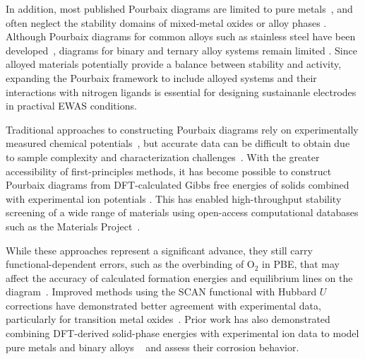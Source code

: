 \documentclass[journal=jacsat,manuscript=article]{achemso}
\begin{document}
In addition, most published Pourbaix diagrams are limited to pure metals~\cite{PourbaixAtlasSolutions, Cao2020E-pHLaterite, HongOn, Meng1996PrinciplesReview}, and often neglect the stability domains of mixed-metal oxides or alloy phases \cite{Ding2018ElectrochemicalStates}. Although Pourbaix diagrams for common alloys such as stainless steel have been developed~\cite{Cubicciotti1985TheSteel, Beverskog1999PourbaixIron-Chromium-Nickel}, diagrams for binary and ternary alloy systems remain limited \cite{Dong2021ElectrochemicalData, Ding2018ElectrochemicalStates}. Since alloyed materials potentially provide a balance between stability and activity, expanding the Pourbaix framework to include alloyed systems and their interactions with nitrogen ligands is essential for designing sustainanle electrodes in practival EWAS conditions.


Traditional approaches to constructing Pourbaix diagrams rely on experimentally measured chemical potentials~\cite{PourbaixAtlasSolutions, Pourbaix1973LecturesCorrosion, Beverskog1999PourbaixIron-Chromium-Nickel}, but accurate data can be difficult to obtain due to sample complexity and characterization challenges~\cite{Huang2017ImprovedCompounds}. With the greater accessibility of first-principles methods, it has become possible to construct Pourbaix diagrams from DFT-calculated Gibbs free energies of solids combined with experimental ion potentials \cite{Wang2020PredictingFunctional, Lopez2023ComputationalStudies, Liu2024ReversiblePH, Ding2018ElectrochemicalStates, Huang2015ElectrochemicalCalculations, Persson2012PredictionStates, Patel2019EfficientCompounds, Oses2018AFLOW-CHULL:Analysis}. This has enabled high-throughput stability screening of a wide range of materials using open-access computational databases such as the Materials Project~\cite{Ong2013PythonAnalysis, Singh2017ElectrochemicalMaterials, Jain2011FormationCalculations, Montoya2015TheoreticalSplitting, Singh2019RobustDiscovery}.

While these approaches represent a significant advance, they still carry functional-dependent errors, such as the overbinding of O$_2$ in PBE, that may affect the accuracy of calculated formation energies and equilibrium lines on the diagram~\cite{Wang2020PredictingFunctional}. Improved methods using the SCAN functional with Hubbard $U$ corrections have demonstrated better agreement with experimental data, particularly for transition metal oxides~\cite{Wang2020PredictingFunctional}. Prior work has also demonstrated combining DFT-derived solid-phase energies with experimental ion data to model pure metals \cite{Huang2017ImprovedCompounds, Liu2024ReversiblePH, Sun2024AssessingStudy} and binary alloys ~\cite{Ding2018ElectrochemicalStates, Dong2021ElectrochemicalData, Malki2023DerivingCalculations, Taylor2021InvestigationsTheory} and assess their corrosion behavior.
\end{document}
